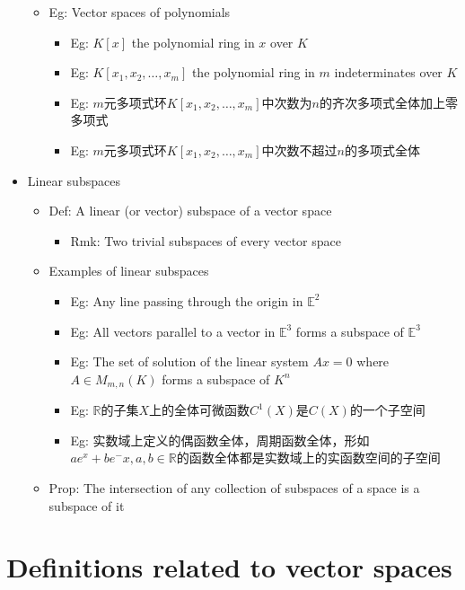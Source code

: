 \documentclass[onecolumn]{ctexart}
\begin{document}
\begin{itemize}
\begin{itemize}
\begin{itemize}
    \end{itemize}
    \item Eg: Vector spaces of polynomials
    \begin{itemize}
      \item Eg: $K[x]$ the polynomial ring in $x$ over $K$
      \item Eg: $K[x_1, x_2, \ldots, x_m]$ the polynomial ring in $m$ indeterminates over $K$
      \item Eg: $m$元多项式环$K[x_1, x_2, \ldots, x_m]$中次数为$n$的齐次多项式全体加上零多项式
      \item Eg: $m$元多项式环$K[x_1, x_2, \ldots, x_m]$中次数不超过$n$的多项式全体
    \end{itemize}
  \end{itemize}
  \item Linear subspaces
  \begin{itemize}
    \item Def: A linear (or vector) subspace of a vector space
    \begin{itemize}
      \item Rmk: Two trivial subspaces of every vector space
    \end{itemize}
    \item Examples of linear subspaces
    \begin{itemize}
      \item Eg: Any line passing through the origin in $\mathbb{E}^2$
      \item Eg: All vectors parallel to a vector in $\mathbb{E}^3$ forms a subspace of $\mathbb{E}^3$
      \item Eg: The set of solution of the linear system $Ax = 0$ where $A \in M_{m,n}(K)$ forms a subspace of $K^n$
      \item Eg: $\mathbb{R}$的子集$X$上的全体可微函数$C^1(X)$是$C(X)$的一个子空间
      \item Eg: 实数域上定义的偶函数全体，周期函数全体，形如$ae^x + be^-x, a,b \in \mathbb{R}$的函数全体都是实数域上的实函数空间的子空间
    \end{itemize}
    \item Prop: The intersection of any collection of subspaces of a space is a subspace of it
  \end{itemize}
\end{itemize}

\section{Definitions related to vector spaces}
\end{document}
